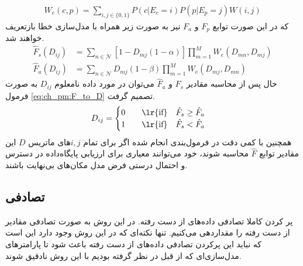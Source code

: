 \begin{equation}
	\begin{aligned}
		W_e(c,p) = \sum_{i,j \in \{0,1\}} P(c|E_c=i)P(p|E_p=j)W(i,j)
	\end{aligned}
	\label{eq:ch_pm:W_e}
\end{equation}
که در این صورت توابع $F_p$ و $F_a$ نیز به صورت زیر همراه با مدل‌سازی خطا بازتعریف خواهند شد.
\begin{equation}
	\begin{aligned}
		\hat{F}_s(D_{ij}) &= \sum_{n \in \mathcal{N}}  [1-D_{mj}(1-\alpha)]  \prod_{m=1}^{M} W_e(D_{mn}, D_{mj}) \\
		\hat{F}_a(D_{ij}) &= \sum_{n \in \mathcal{N}}  D_{mj}(1-\beta)  \prod_{m=1}^{M} W_e(D_{mj}, D_{mn})
	\end{aligned}
	\label{eq:ch_pm:F_all_final}
\end{equation}
حال پس از محاسبه مقادیر $\hat{F}_s$ و $\hat{F}_a$ می‌توان در مورد داده نامعلوم $D_{ij}$  به صورت فرمول \ref{eq:ch_pm:F_to_D} تصمیم گرفت.
\begin{equation}
	D_{ij} = \begin{cases}
		0 \qquad \text{\lr{if}} \quad \hat{F}_s \ge \hat{F}_a \\
		1 \qquad \text{\lr{if}} \quad \hat{F}_s < \hat{F}_a
	\end{cases}
	\label{eq:ch_pm:F_to_D}
\end{equation}
همچنین با کمی دقت در فرمول‌بندی انجام شده اگر برای تمام $i,j$های ماتریس $D$ این مقادیر توابع $\hat{F}$ محاسبه شوند، خود می‌توانند معیاری برای ارزیابی پایگاه‌داده در دسترس و احتمال درستی فرض مدل مکان‌های بی‌نهایت باشند.



\subsection{تصادفی}
پر کردن کاملا تصادفی داده‌های از دست رفته. در این روش به صورت تصادفی مقادیر از دست رفته را مقداردهی می‌کنیم. تنها نکته‌ای که در این روش وجود دارد این است که نباید این پرکردن تصادفی داده‌های از دست رفته باعث شود تا پارامترهای مدل‌سازی‌ای که از قبل در نظر گرفته بودیم با این روش نادقیق شوند.


